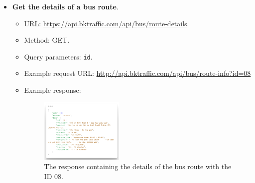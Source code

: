 \begin{itemize}
    \item \textbf{Get the details of a bus route}.
    \begin{itemize}
        \item URL: \url{https://api.bktraffic.com/api/bus/route-details}.
        \item Method: GET.
        \item Query parameters: \lstinline{id}.
        \item Example request URL: \url{http://api.bktraffic.com/api/bus/route-info?id=08}
        \item Example response:
        \begin{figure}[H]
            \centering
            \includegraphics[width=0.4\textwidth]{assets/images/Implementation/route_details_response.png}
            \caption{The response containing the details of the bus route with the ID 08.}
            \label{fig:route_details_response}
        \end{figure}
    \end{itemize}


\end{itemize}
